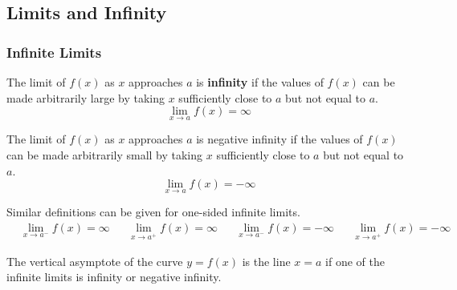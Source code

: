 \subsection{Limits and Infinity}

\subsubsection*{Infinite Limits}
\begin{definition}
    The limit of \(f(x)\) as \(x\) approaches \(a\) is \textbf{infinity} if
    the values of \(f(x)\) can be made arbitrarily large by taking \(x\)
    sufficiently close to \(a\) but not equal to \(a\).
    \[\lim_{x\to a}f(x)=\infty\]
\end{definition}
\begin{definition}
    The limit of \(f(x)\) as \(x\) approaches \(a\) is negative infinity if
    the values of \(f(x)\) can be made arbitrarily small by taking \(x\)
    sufficiently close to \(a\) but not equal to \(a\).
    \[\lim_{x\to a}f(x)=-\infty\]
\end{definition}
Similar definitions can be given for one-sided infinite limits.
\begin{align*}
    &\lim_{x\to a^-}f(x)=\infty && \lim_{x\to a^+}f(x)=\infty&
    &\lim_{x\to a^-}f(x)=-\infty && \lim_{x\to a^+}f(x)=-\infty&
\end{align*}
\begin{definition}
    The vertical asymptote of the curve \(y=f(x)\) is the line \(x=a\) if one
    of the infinite limits is infinity or negative infinity.
\end{definition}

